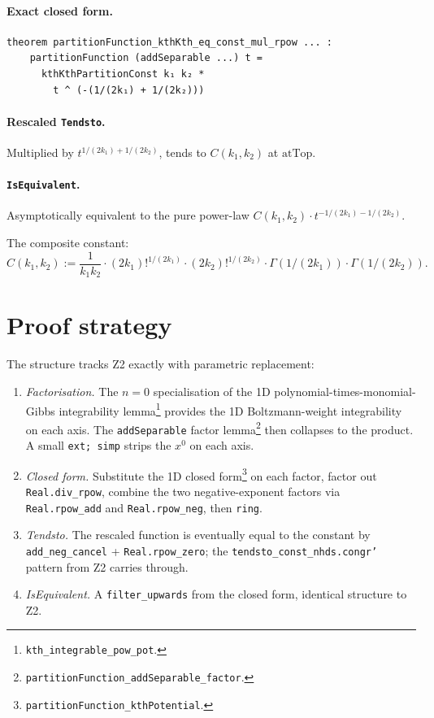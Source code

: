 \documentclass[11pt]{article}
\begin{document}
\paragraph{Exact closed form.}
\begin{verbatim}
theorem partitionFunction_kthKth_eq_const_mul_rpow ... :
    partitionFunction (addSeparable ...) t =
      kthKthPartitionConst k₁ k₂ *
        t ^ (-(1/(2k₁) + 1/(2k₂)))
\end{verbatim}

\paragraph{Rescaled \texttt{Tendsto}.} Multiplied by
$t^{1/(2k_1) + 1/(2k_2)}$, tends to $C(k_1, k_2)$ at $\mathrm{atTop}$.

\paragraph{\texttt{IsEquivalent}.} Asymptotically equivalent to the
pure power-law $C(k_1, k_2)\cdot t^{-1/(2k_1) - 1/(2k_2)}$.

The composite constant:
$$
  C(k_1, k_2) := \frac{1}{k_1 k_2}\cdot (2k_1)!^{1/(2k_1)}\cdot
    (2k_2)!^{1/(2k_2)}\cdot \Gamma(1/(2k_1))\cdot \Gamma(1/(2k_2)).
$$

\section{Proof strategy}

The structure tracks Z2 exactly with parametric replacement:

\begin{enumerate}[leftmargin=2em]
\item \emph{Factorisation.} The $n = 0$ specialisation of the 1D
polynomial-times-monomial-Gibbs integrability lemma\footnote{\texttt{kth\_integrable\_pow\_pot}.}
provides the 1D Boltzmann-weight integrability on each axis. The
\texttt{addSeparable} factor lemma\footnote{\texttt{partitionFunction\_addSeparable\_factor}.}
then collapses to the product. A small \texttt{ext; simp} strips
the $x^0$ on each axis.
\item \emph{Closed form.} Substitute the 1D closed
form\footnote{\texttt{partitionFunction\_kthPotential}.} on each
factor, factor out \texttt{Real.div\_rpow}, combine the two
negative-exponent factors via \texttt{Real.rpow\_add} and
\texttt{Real.rpow\_neg}, then \texttt{ring}.
\item \emph{Tendsto.} The rescaled function is eventually equal to
the constant by \texttt{add\_neg\_cancel} + \texttt{Real.rpow\_zero};
the \texttt{tendsto\_const\_nhds.congr'} pattern from Z2 carries
through.
\item \emph{IsEquivalent.} A \texttt{filter\_upwards} from the
closed form, identical structure to Z2.
\end{enumerate}
\end{document}
